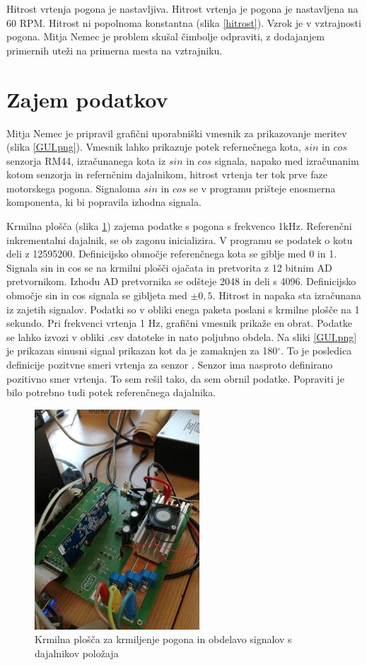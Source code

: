 Hitrost vrtenja pogona je nastavljiva.
Hitrost vrtenja je pogona je nastavljena na 60 RPM. Hitrost ni popolnoma konstantna (slika \ref{hitrost}). Vzrok je v vztrajnosti pogona. Mitja Nemec je problem skušal čimbolje odpraviti, z dodajanjem primernih uteži na primerna mesta na vztrajniku.
\newpage
\section{Zajem podatkov}
Mitja Nemec je pripravil grafični uporabniški vmesnik za prikazovanje meritev (slika \ref{GUI.png}).
Vmesnik lahko prikazuje potek refernečnega kota, $sin$ in $cos$ senzorja RM44, izračunanega kota iz $sin$ in $cos$ signala, napako med izračunanim kotom senzorja in refernčnim dajalnikom, hitrost vrtenja ter tok prve faze motorskega pogona. Signaloma $sin$ in $cos$ se v programu prišteje enosmerna komponenta, ki bi popravila izhodna signala.

Krmilna plošča (slika \ref{krmilnaplosca.jpg}) zajema podatke s pogona s frekvenco 1kHz.
Referenčni inkrementalni dajalnik, se ob zagonu inicializira. V programu se podatek o kotu deli z 12595200. Definicijsko območje referenčnega kota se giblje med 0 in 1.
Signala sin in cos se na krmilni plošči ojačata in pretvorita z 12 bitnim AD pretvornikom. Izhodu AD pretvornika se odšteje 2048 in deli s 4096. Definicijsko območje sin in cos signala se gibljeta med $\pm0,5$.
Hitrost in napaka sta izračunana iz zajetih signalov.
Podatki so v obliki enega paketa poslani s krmilne plošče na 1 sekundo. Pri frekvenci vrtenja 1 Hz, grafični vmesnik prikaže en obrat.
Podatke se lahko izvozi v obliki .csv datoteke in nato poljubno obdela.
Na sliki  \ref{GUI.png} je prikazan sinusni signal prikazan kot da je zamaknjen za 180$\mathrm{^\circ}$. To je posledica definicije pozitvne smeri vrtenja za senzor \cite{RM44}. Senzor ima nasproto definirano pozitivno smer vrtenja. To sem rešil tako, da sem obrnil podatke. Popraviti je bilo potrebno tudi potek referenčnega dajalnika.
\begin{figure}[h!]
	\centering
	\includegraphics[width=0.55\textwidth]{./Slike/krmilnaplosca.jpg}
	\caption{Krmilna plošča za krmiljenje pogona in obdelavo signalov s dajalnikov položaja}
	\label{krmilnaplosca.jpg}
\end{figure}
\newpage
